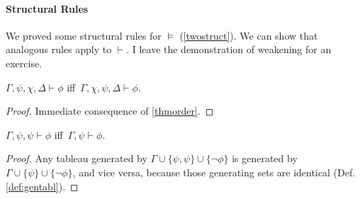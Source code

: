 \paragraph{Structural Rules} We proved some structural rules for $\vDash$ (\autoref{twostruct}). We can show that analogous rules apply to $\vdash$. I leave the demonstration of weakening for an exercise. \begin{theorem}
	$\Gamma, \psi, \chi, \Delta \vdash \phi$ iff\, $\Gamma, \chi, \psi, \Delta \vdash \phi$. \begin{proof}
	Immediate consequence of \autoref{thmorder}.
	\end{proof}
\end{theorem}
\begin{theorem}
$\Gamma, \psi, \psi \vdash \phi$ iff\, $\Gamma, \psi \vdash \phi$. \begin{proof}
	Any tableau generated by $\Gamma \cup \{\psi,\psi\} \cup \{¬\phi\}$ is generated by $\Gamma\cup \{\psi\} \cup \{¬\phi\}$, and vice versa, because those generating sets are identical (Def. \ref{def:gentabl}).
\end{proof}
\end{theorem}


